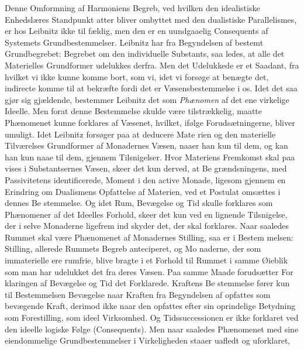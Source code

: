\documentclass[12pt,a4paper]{book}
\begin{document}
Denne Omformning af Harmoniens Begreb, ved hvilken
den idealistiske Enhedslæres Standpunkt atter bliver ombyttet
med den dualistiske Parallelismes, er hos Leibnitz ikke til\-%
fældig, men den er en uundgaaelig Consequents af Systemets
Grundbestemmelser. Leibnitz har fra Begyndelsen af bestemt
Grundbegrebet: Begrebet om den individuelle Substants, saa\-%
ledes, at alle det Materielles Grundformer udelukkes derfra.
Men det Udelukkede er et Saadant, fra hvilket vi ikke kunne
komme bort, som vi, idet vi forsøge at benægte det, indirecte
komme til at bekræfte fordi det er Væsensbestemmelse i os.
Idet det saa gjør sig gjældende, bestemmer Leibnitz det som
\emph{Phænomen} af det ene virkelige Ideelle. Men forat denne
Bestemmelse skulde være tilstrækkelig, maatte Phænomenet
kunne forklares af Væsenet, hvilket, ifølge Forudsætningerne,
bliver umuligt. Idet Leibnitz forsøger paa at deducere Mate\-%
rien og den materielle Tilværelses Grundformer af Monadernes
Væsen, naaer han kun til dem, og kan han kun naae til dem,
gjennem Tilsnigelser. Hvor Materiens Fremkomst skal paa\-%
vises i Substantsernes Væsen, skeer det kun derved, at Be\-%
grændsningens, med Passivitetens identificerede, Moment i den
active Monade, ligesom gjennem en Erindring om Dualismens
Opfattelse af Materien, ved et Postulat omsættes i dennes Be\-%
stemmelse. Og idet Rum, Bevægelse og Tid skulle forklares
som Phænomener af det Ideelles Forhold, skeer det kun ved
en lignende Tilsnigelse, der i selve Monaderne ligefrem ind\-%
skyder det, der skal forklares. Naar saaledes Rummet skal
være Phænomenet af Monadernes Stilling, saa er i Bestem\-%
melsen: Stilling, allerede Rummets Begreb anteciperet, og Mo\-%
naderne, der som immaterielle ere rumfrie, blive bragte i et
Forhold til Rummet i samme Øieblik som man har udelukket
det fra deres Væsen. Paa samme Maade forudsætter For\-%
klaringen af Bevægelse og Tid det Forklarede. Kraftens Be\-%
stemmelse fører kun til Bestemmelsen Bevægelse naar Kraften
fra Begyndelsen af opfattes som bevægende Kraft, derimod
ikke naar den opfattes efter sin oprindelige Betydning som
Forestilling, som ideel Virksomhed. Og Tidssuccessionen er
ikke forklaret ved den ideelle logiske Følge (Consequents).
Men naar saaledes Phænomenet med sine eiendommelige
Grundbestemmelser i Virkeligheden staaer uafledt og uforklaret,
\end{document}
